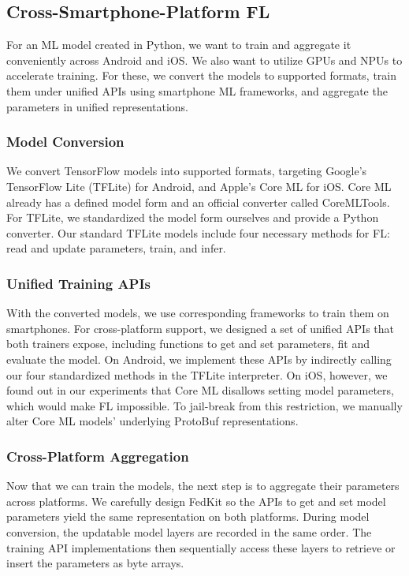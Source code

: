 \documentclass[letterpaper]{article} %
\begin{document}
\subsection{Cross-Smartphone-Platform FL}

For an ML model created in Python,
we want to train and aggregate it conveniently across Android and iOS.
We also want to utilize GPUs and NPUs to accelerate training.
For these, we convert the models to supported formats,
train them under unified APIs using smartphone ML frameworks,
and aggregate the parameters in unified representations.

\subsubsection{Model Conversion}
We convert TensorFlow models into supported formats,
targeting Google's TensorFlow Lite (TFLite) for Android,
and Apple's Core ML for iOS.
Core ML already has a defined model form and an official converter called
CoreMLTools.
For TFLite, we standardized the model form ourselves and
provide a Python converter.
Our standard TFLite models include four necessary methods for FL:
read and update parameters, train, and infer.

\subsubsection{Unified Training APIs}
With the converted models, we use corresponding frameworks to train them
on smartphones.
For cross-platform support,
we designed a set of unified APIs that both trainers expose,
including functions to get and set parameters, fit and evaluate the model.
On Android, we implement these APIs by indirectly calling
our four standardized methods in the TFLite interpreter.
On iOS, however, we found out in our experiments that
Core ML disallows setting model parameters,
which would make FL impossible.
To jail-break from this restriction, we manually alter
Core ML models' underlying ProtoBuf representations.

\subsubsection{Cross-Platform Aggregation}
Now that we can train the models,
the next step is to aggregate their parameters across platforms.
We carefully design FedKit so the APIs to get and set model parameters
yield the same representation on both platforms.
During model conversion,
the updatable model layers are recorded in the same order.
The training API implementations then sequentially access these layers to
retrieve or insert the parameters as byte arrays.
\end{document}
